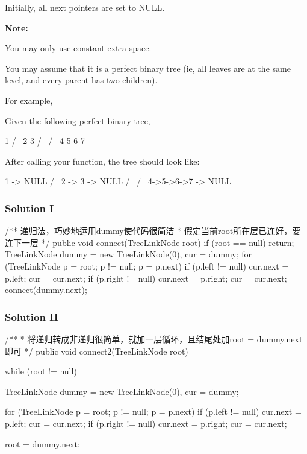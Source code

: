 Initially, all next pointers are set to NULL.

\textbf{Note:}

You may only use constant extra space.

You may assume that it is a perfect binary tree (ie, all leaves are at the same level, and every parent has two children).

For example,

Given the following perfect binary tree,
\begin{Code}
         1
       /  \
      2    3
     / \  / \
    4  5  6  7
\end{Code}

After calling your function, the tree should look like:
\begin{Code}
         1 -> NULL
       /  \
      2 -> 3 -> NULL
     / \  / \
    4->5->6->7 -> NULL
\end{Code}

\newpage

\subsubsection{Solution I}

\begin{Code}
/** 递归法，巧妙地运用dummy使代码很简洁
 *  假定当前root所在层已连好，要连下一层
 */
public void connect(TreeLinkNode root) {
    if (root == null) {
        return;
    }
    TreeLinkNode dummy = new TreeLinkNode(0), cur = dummy;
    for (TreeLinkNode p = root; p != null; p = p.next) {
        if (p.left != null) {
            cur.next = p.left;
            cur = cur.next;
        }
        if (p.right != null) {
            cur.next = p.right;
            cur = cur.next;
        }
    }
    connect(dummy.next);
}

\end{Code}

\subsubsection{Solution II}

\begin{Code}
/**
 * 将递归转成非递归很简单，就加一层循环，且结尾处加root = dummy.next即可
 */
public void connect2(TreeLinkNode root) {
    while (root != null) {
        TreeLinkNode dummy = new TreeLinkNode(0), cur = dummy;

        for (TreeLinkNode p = root; p != null; p = p.next) {
            if (p.left != null) {
                cur.next = p.left;
                cur = cur.next;
            }
            if (p.right != null) {
                cur.next = p.right;
                cur = cur.next;
            }
        }

        root = dummy.next;
    }
}
\end{Code}

